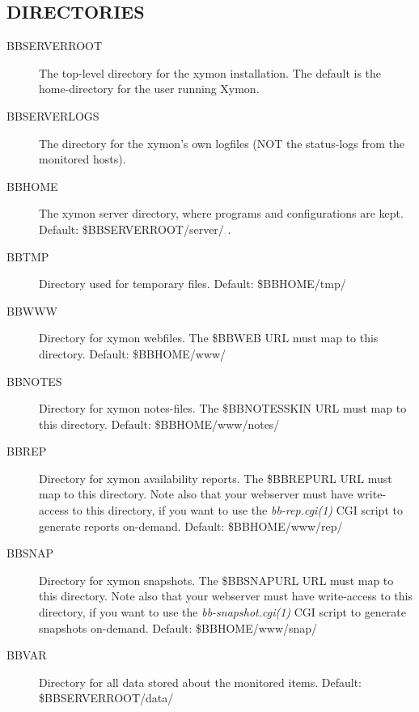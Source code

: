 \subsection{DIRECTORIES}


 \begin{description}
\item[BBSERVERROOT] The top-level directory for the xymon installation. The default is the home-directory for the user running Xymon. 

 

\item[BBSERVERLOGS] The directory for the xymon's own logfiles (NOT the status-logs from the monitored hosts). 

 

\item[BBHOME] The xymon server directory, where programs and configurations are kept. Default: \$BBSERVERROOT/server/ . 

 

\item[BBTMP] Directory used for temporary files. Default: \$BBHOME/tmp/ 

 

\item[BBWWW] Directory for xymon webfiles. The \$BBWEB URL must map to this directory. Default: \$BBHOME/www/ 

 

\item[BBNOTES] Directory for xymon notes-files. The \$BBNOTESSKIN URL must map to this directory. Default: \$BBHOME/www/notes/ 

 

\item[BBREP] Directory for xymon availability reports. The \$BBREPURL URL must map to this directory. Note also that your webserver must have write-access to this directory, if you want to use the \emph{bb-rep.cgi(1)}
 CGI script to generate reports on-demand. Default: \$BBHOME/www/rep/ 

 

\item[BBSNAP] Directory for xymon snapshots. The \$BBSNAPURL URL must map to this directory. Note also that your webserver must have write-access to this directory, if you want to use the \emph{bb-snapshot.cgi(1)}
 CGI script to generate snapshots on-demand. Default: \$BBHOME/www/snap/ 

 

\item[BBVAR] Directory for all data stored about the monitored items. Default: \$BBSERVERROOT/data/ 


\end{description}
